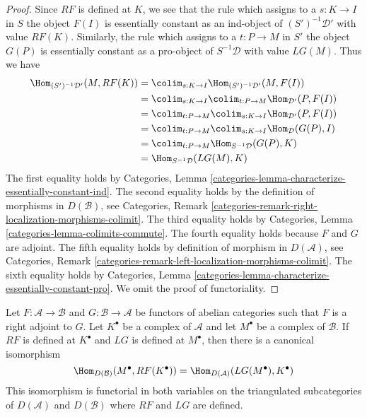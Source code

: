 \begin{proof}
Since $RF$ is defined at $K$, we see that the rule which assigns to a
$s : K \to I$ in $S$ the object $F(I)$ is essentially
constant as an ind-object of $(S')^{-1}\mathcal{D}'$ with value $RF(K)$.
Similarly, the rule which assigns to a $t : P \to M$ in $S'$
the object $G(P)$ is essentially constant as a pro-object of
$S^{-1}\mathcal{D}$ with value $LG(M)$. Thus we have
\begin{align*}
\Hom_{(S')^{-1}\mathcal{D}'}(M, RF(K))
& =
\colim_{s : K \to I} \Hom_{(S')^{-1}\mathcal{D}'}(M, F(I)) \\
& =
\colim_{s : K \to I} \colim_{t : P \to M} \Hom_{\mathcal{D}'}(P, F(I)) \\
& =
\colim_{t : P \to M} \colim_{s : K \to I} \Hom_{\mathcal{D}'}(P, F(I)) \\
& =
\colim_{t : P \to M} \colim_{s : K \to I} \Hom_{\mathcal{D}}(G(P), I) \\
& =
\colim_{t : P \to M} \Hom_{S^{-1}\mathcal{D}}(G(P), K) \\
& =
\Hom_{S^{-1}\mathcal{D}}(LG(M), K)
\end{align*}
The first equality holds by
Categories, Lemma \ref{categories-lemma-characterize-essentially-constant-ind}.
The second equality holds by the definition of morphisms in
$D(\mathcal{B})$, see Categories, Remark
\ref{categories-remark-right-localization-morphisms-colimit}.
The third equality holds by
Categories, Lemma \ref{categories-lemma-colimits-commute}.
The fourth equality holds because $F$ and $G$ are adjoint.
The fifth equality holds by definition of morphism
in $D(\mathcal{A})$, see Categories, Remark
\ref{categories-remark-left-localization-morphisms-colimit}.
The sixth equality holds by
Categories, Lemma \ref{categories-lemma-characterize-essentially-constant-pro}.
We omit the proof of functoriality.
\end{proof}

\begin{lemma}
\label{lemma-pre-derived-adjoint-functors}
Let $F : \mathcal{A} \to \mathcal{B}$ and $G : \mathcal{B} \to \mathcal{A}$
be functors of abelian categories such that $F$ is a right adjoint to $G$.
Let $K^\bullet$ be a complex of $\mathcal{A}$ and let $M^\bullet$ be
a complex of $\mathcal{B}$. If $RF$ is defined at $K^\bullet$
and $LG$ is defined at $M^\bullet$, then there is a canonical isomorphism
$$
\Hom_{D(\mathcal{B})}(M^\bullet, RF(K^\bullet)) =
\Hom_{D(\mathcal{A})}(LG(M^\bullet), K^\bullet)
$$
This isomorphism is functorial in both variables on the triangulated
subcategories of $D(\mathcal{A})$ and $D(\mathcal{B})$
where $RF$ and $LG$ are defined.
\end{lemma}


